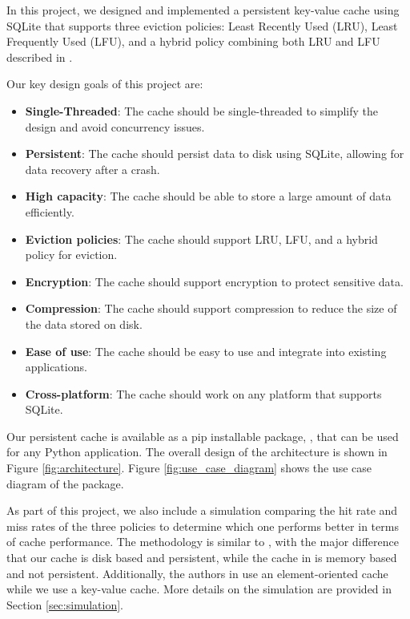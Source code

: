 \documentclass[11pt, journal]{IEEEtran}
\begin{document}
In this project, we designed and implemented a
persistent key-value cache using SQLite
that supports three eviction policies: Least Recently Used (LRU),
Least Frequently Used (LFU), and a hybrid policy combining both LRU and LFU
described in \cite{shah2023ImprovedCacheEviction}.


Our key design goals of this project are:
\begin{itemize}
    \item \textbf{Single-Threaded}: The cache should be single-threaded to simplify the design and avoid concurrency issues.
    \item \textbf{Persistent}: The cache should persist data to disk using SQLite, allowing for data recovery after a crash.
    \item \textbf{High capacity}: The cache should be able to store a large amount of data efficiently.
    \item \textbf{Eviction policies}: The cache should support LRU, LFU, and a hybrid policy for eviction.
    \item \textbf{Encryption}: The cache should support encryption to protect sensitive data.
    \item \textbf{Compression}: The cache should support compression to reduce the size of the data stored on disk.
    \item \textbf{Ease of use}: The cache should be easy to use and integrate into existing applications.
    \item \textbf{Cross-platform}: The cache should work on any platform that supports SQLite.
\end{itemize}

Our persistent cache is available as a pip installable package,
\sqlitecache, that
can be used for any Python application.
The overall design of the architecture is shown in Figure \ref{fig:architecture}.
Figure \ref{fig:use_case_diagram} shows the use case diagram of the package.

As part of this project, we also include a simulation 
comparing the hit rate
and miss rates of the three policies to determine which one performs better
in terms of cache performance. The methodology is similar to \cite{shah2023ImprovedCacheEviction},
with the major difference that our cache is disk based and persistent,
while the cache in \cite{shah2023ImprovedCacheEviction} is memory based and not persistent.
Additionally, the authors in \cite{shah2023ImprovedCacheEviction} use an element-oriented
cache while we use a key-value cache. More details on the simulation
are provided in Section \ref{sec:simulation}.
\end{document}
